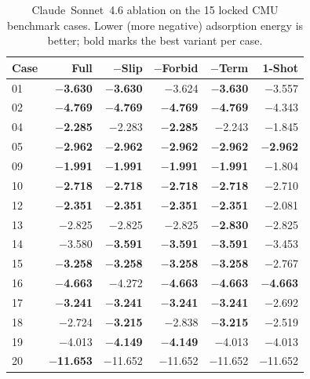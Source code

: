 \begin{table}[h]
\centering
\small
\caption{Claude~Sonnet~4.6 ablation on the 15 locked CMU benchmark cases. Lower (more negative) adsorption energy is better; bold marks the best variant per case.}
\label{tab:si-ablation-claude}
\begin{tabular}{lrrrrr}
\toprule
Case & Full & $-$Slip & $-$Forbid & $-$Term & 1-Shot \\
\midrule
01 & \textbf{$-$3.630} & \textbf{$-$3.630} & $-$3.624 & \textbf{$-$3.630} & $-$3.557 \\
02 & \textbf{$-$4.769} & \textbf{$-$4.769} & \textbf{$-$4.769} & \textbf{$-$4.769} & $-$4.343 \\
04 & \textbf{$-$2.285} & $-$2.283 & \textbf{$-$2.285} & $-$2.243 & $-$1.845 \\
05 & \textbf{$-$2.962} & \textbf{$-$2.962} & \textbf{$-$2.962} & \textbf{$-$2.962} & \textbf{$-$2.962} \\
09 & \textbf{$-$1.991} & \textbf{$-$1.991} & \textbf{$-$1.991} & \textbf{$-$1.991} & $-$1.804 \\
10 & \textbf{$-$2.718} & \textbf{$-$2.718} & \textbf{$-$2.718} & \textbf{$-$2.718} & $-$2.710 \\
12 & \textbf{$-$2.351} & \textbf{$-$2.351} & \textbf{$-$2.351} & \textbf{$-$2.351} & $-$2.081 \\
13 & $-$2.825 & $-$2.825 & $-$2.825 & \textbf{$-$2.830} & $-$2.825 \\
14 & $-$3.580 & \textbf{$-$3.591} & \textbf{$-$3.591} & \textbf{$-$3.591} & $-$3.453 \\
15 & \textbf{$-$3.258} & \textbf{$-$3.258} & \textbf{$-$3.258} & \textbf{$-$3.258} & $-$2.767 \\
16 & \textbf{$-$4.663} & $-$4.272 & \textbf{$-$4.663} & \textbf{$-$4.663} & \textbf{$-$4.663} \\
17 & \textbf{$-$3.241} & \textbf{$-$3.241} & \textbf{$-$3.241} & \textbf{$-$3.241} & $-$2.692 \\
18 & $-$2.724 & \textbf{$-$3.215} & $-$2.838 & \textbf{$-$3.215} & $-$2.519 \\
19 & $-$4.013 & \textbf{$-$4.149} & \textbf{$-$4.149} & $-$4.013 & $-$4.013 \\
20 & \textbf{$-$11.653} & $-$11.652 & $-$11.652 & $-$11.652 & $-$11.652 \\
\bottomrule
\end{tabular}
\end{table}

